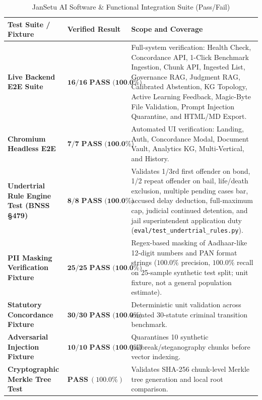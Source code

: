 \documentclass[12pt,a4paper,oneside]{report}
\begin{document}
\begin{table}[H]
\centering
\small
\caption{JanSetu AI Software \& Functional Integration Suite (Pass/Fail)}
\label{tab:software_benchmarks}
\begin{tabularx}{\textwidth}{lp{3.0cm}X}
\toprule
\textbf{Test Suite / Fixture} & \textbf{Verified Result} & \textbf{Scope and Coverage} \\
\midrule
\textbf{Live Backend E2E Suite} & $\mathbf{16/16\text{ PASS (100.0\%)}}$ & Full-system verification: Health Check, Concordance API, 1-Click Benchmark Ingestion, Chunk API, Ingested List, Governance RAG, Judgment RAG, Calibrated Abstention, KG Topology, Active Learning Feedback, Magic-Byte File Validation, Prompt Injection Quarantine, and HTML/MD Export. \\
\addlinespace
\textbf{Chromium Headless E2E} & $\mathbf{7/7\text{ PASS (100.0\%)}}$ & Automated UI verification: Landing, Auth, Concordance Modal, Document Vault, Analytics KG, Multi-Vertical, and History. \\
\addlinespace
\textbf{Undertrial Rule Engine Test (BNSS \S 479)} & $\mathbf{8/8\text{ PASS (100.0\%)}}$ & Validates 1/3rd first offender on bond, 1/2 repeat offender on bail, life/death exclusion, multiple pending cases bar, accused delay deduction, full-maximum cap, judicial continued detention, and jail superintendent application duty (\texttt{eval/test\_undertrial\_rules.py}). \\
\addlinespace
\textbf{PII Masking Verification Fixture} & $\mathbf{25/25\text{ PASS (100.0\%)}}$ & Regex-based masking of Aadhaar-like 12-digit numbers and PAN format strings ($100.0\%$ precision, $100.0\%$ recall on 25-sample synthetic test split; unit fixture, not a general population estimate). \\
\addlinespace
\textbf{Statutory Concordance Fixture} & $\mathbf{30/30\text{ PASS (100.0\%)}}$ & Deterministic unit validation across curated 30-statute criminal transition benchmark. \\
\addlinespace
\textbf{Adversarial Injection Fixture} & $\mathbf{10/10\text{ PASS (100.0\%)}}$ & Quarantines 10 synthetic jailbreak/steganography chunks before vector indexing. \\
\addlinespace
\textbf{Cryptographic Merkle Tree Test} & $\mathbf{PASS\ (100.0\%)}$ & Validates SHA-256 chunk-level Merkle tree generation and local root comparison. \\
\bottomrule
\end{tabularx}
\end{table}
\end{document}
